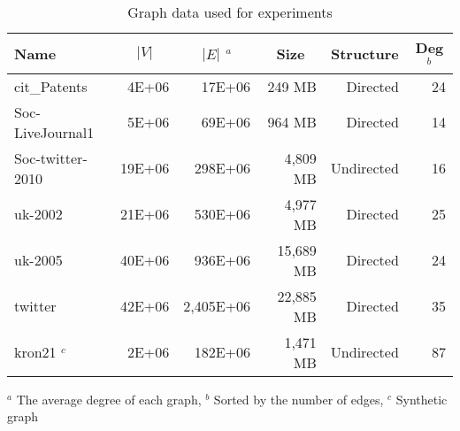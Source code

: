 \begin{table}[t]
\begin{threeparttable}
\begin{scriptsize}
 \caption{Graph data used for experiments}
 \label{tab:iter}
 \centering
\begin{tabular}{lrrrrr}
     \toprule 
\multicolumn{1}{l}{Name} & \multicolumn{1}{c}{$|V|$} & 
\multicolumn{1}{c}{$|E|$ $^a$} & %
\multicolumn{1}{c}{Size} & \multicolumn{1}{c}{Structure} & 
\multicolumn{1}{c}{Deg $^b$} \\ %
\midrule
cit\_Patents & 4E+06 & 17E+06 & 249 MB & Directed & 24 \\
Soc-LiveJournal1 & 5E+06 & 69E+06 & 964 MB & Directed & 14 \\
Soc-twitter-2010 & 19E+06 & 298E+06 & 4,809 MB & Undirected & 16 \\
uk-2002 & 21E+06 & 530E+06 & 4,977 MB & Directed & 25 \\ 
uk-2005 & 40E+06 & 936E+06 & 15,689 MB & Directed & 24 \\ 
twitter & 42E+06 & 2,405E+06 & 22,885 MB & Directed & 35 \\
kron21 $^c$ & 2E+06 & 182E+06 & 1,471 MB & Undirected & 87 \\  %
    \bottomrule
    \end{tabular}
    \begin{tablenotes}
      \tiny
      \item {$^a$ The average degree of each graph, $^b$ Sorted by the number of edges, $^c$ Synthetic graph}
    \end{tablenotes}
 \label{tab:graphs}
\end{scriptsize}
\end{threeparttable}
\end{table}